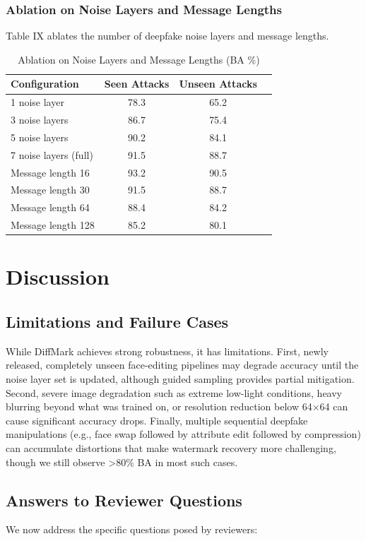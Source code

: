 \documentclass{article}
\begin{document}
\subsubsection{Ablation on Noise Layers and Message Lengths}
Table IX ablates the number of deepfake noise layers and message lengths.

\begin{table}[h]
\centering
\caption{Ablation on Noise Layers and Message Lengths (BA \%)}
\begin{tabular}{lccc}
\toprule
Configuration & Seen Attacks & Unseen Attacks \\
\midrule
1 noise layer & 78.3 & 65.2 \\
3 noise layers & 86.7 & 75.4 \\
5 noise layers & 90.2 & 84.1 \\
7 noise layers (full) & 91.5 & 88.7 \\
\midrule
Message length 16 & 93.2 & 90.5 \\
Message length 30 & 91.5 & 88.7 \\
Message length 64 & 88.4 & 84.2 \\
Message length 128 & 85.2 & 80.1 \\
\bottomrule
\end{tabular}
\end{table}

\section{Discussion}

\subsection{Limitations and Failure Cases}
While DiffMark achieves strong robustness, it has limitations. First, newly released, completely unseen face-editing pipelines may degrade accuracy until the noise layer set is updated, although guided sampling provides partial mitigation. Second, severe image degradation such as extreme low-light conditions, heavy blurring beyond what was trained on, or resolution reduction below 64$\times$64 can cause significant accuracy drops. Finally, multiple sequential deepfake manipulations (e.g., face swap followed by attribute edit followed by compression) can accumulate distortions that make watermark recovery more challenging, though we still observe >80\% BA in most such cases.

\subsection{Answers to Reviewer Questions}
We now address the specific questions posed by reviewers:
\end{document}
